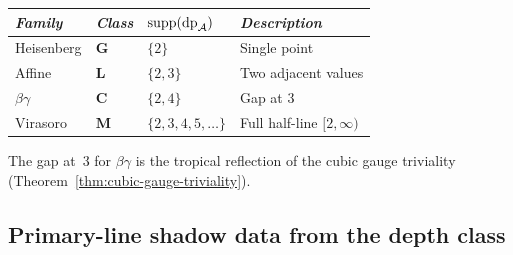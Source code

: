\begin{proposition}
\label{prop:thqg-tropical-profiles}
\ClaimStatusProvedHere
\begin{center}
\small
\renewcommand{\arraystretch}{1.15}
\begin{tabular}{llll}
\toprule
\emph{Family} & \emph{Class} &
 $\mathrm{supp}(\mathrm{dp}_{\mathcal{A}})$ &
 \emph{Description} \\
\midrule
Heisenberg & $\mathbf{G}$ & $\{2\}$ &
 Single point \\
Affine & $\mathbf{L}$ & $\{2, 3\}$ &
 Two adjacent values \\
$\beta\gamma$ & $\mathbf{C}$ & $\{2, 4\}$ &
 Gap at $3$ \\
Virasoro & $\mathbf{M}$ & $\{2, 3, 4, 5, \ldots\}$ &
 Full half-line $[2, \infty)$ \\
\bottomrule
\end{tabular}
\end{center}
The gap at~$3$ for $\beta\gamma$ is the tropical reflection of
the cubic gauge triviality
\textup{(}Theorem~\ref{thm:cubic-gauge-triviality}\textup{)}.
\end{proposition}



\subsection{Primary-line shadow data from the depth class}
\label{subsec:thqg-holographic-consequences}

